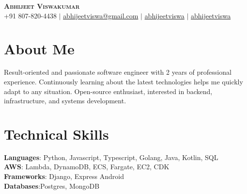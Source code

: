 \documentclass[a4paper,11pt]{article}
\begin{document}

\begin{center}
    \textbf{\Huge \scshape Abhijeet Viswakumar} \\ \vspace{1pt}
    \faPhone\;\small +91 807-820-4438 $|$
    \faEnvelopeO\;\href{mailto:abhijeetviswa@gmail.com}{abhijeetviswa@gmail.com} $|$
    \faLinkedinSquare\;\href{https://linkedin.com/in/abhijeetviswa}{abhijeetviswa} $|$
    \faGithub\;\href{https://github.com/abhijeetviswa}{abhijeetviswa}
\end{center}


\begin{multicols}{2}
    \section{About Me}
    \small{Result-oriented and passionate software engineer with 2 years of professional experience.
    Continuously learning about the latest technologies helps me quickly adapt to any situation. Open-source enthusiast, interested in backend,
    infrastructure, and systems development.}
  \columnbreak
\section{Technical Skills}
 \begin{itemize}[leftmargin=0.15in, label={}]
    \small{\item{
     \textbf{Languages}{: Python, Javascript, Typescript, Golang, Java, Kotlin, SQL} \\
     \textbf{AWS}{: Lambda, DynamoDB, ECS, Fargate, EC2, CDK} \\
		 \textbf{Frameworks}{: Django, Express Android} \\
     \textbf{Databases}{:Postgres, MongoDB} \\
    }}
 \end{itemize}

\end{multicols}
\end{document}
